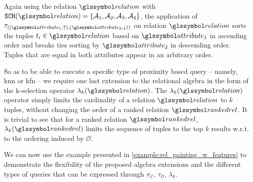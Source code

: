 Again using the relation $\relation$ with $\mathtt{SCH}(\relation) = \{ \mathcal{A}_1, \mathcal{A}_2, \mathcal{A}_3, \mathcal{A}_4 \}$, the application of $\tau_{((\attribute_1,\uparrow),(\attribute_2,\downarrow))}$ on relation $\relation$ sorts the tuples $t_i \in \relation$ based on $\attribute_1$ in ascending order and breaks ties sorting by $\attribute_2$ in descending order. Tuples that are equal in both attributes appear in an arbitrary order.

So as to be able to execute a specific type of proximity based query -- namely, \acrshort{knn} or \acrshort{kfn} -- we require one last extension to the relational algebra in the form of the k-selection operator $\lambda_k(\relation)$. The $\lambda_k(\relation)$ operator simply limits the cardinality of a relation $\relation$ to $k$ tuples, without changing the order of a ranked relation $\rankedrel$. It is trivial to see that for a ranked relation $\rankedrel$, $\lambda_k(\rankedrel)$ limits the sequence of tuples to the top $k$ results w.r.t. to the ordering induced by $\mathcal{O}$.

We can now use the example presented in \cref{example:rel_painting_w_features} to demonstrate the flexibility of the proposed algebra extensions and the different types of queries that can be expressed through $\pi_{\mathcal{E}}$, $\tau_{\mathcal{O}}$, $\lambda_k$.

